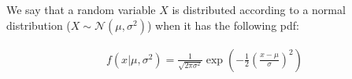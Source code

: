 \documentclass[10pt]{beamer}
\numberwithin{equation}{section}
\begin{document}
    \appendix

    \begin{frame}
        We say that a random variable $X$ is distributed
        according to a normal distribution ($X \sim \mathcal{N}(\mu, \sigma^2)$) when it has the following pdf:

        \begin{definition}
            \begin{align}
                \label{eq:pdf_normal_dist}
                f(x|\mu, \sigma^2) = \frac{1}{\sqrt{2\pi\sigma^2}}
                \exp{\left(-\frac{1}{2}\left(\frac{x-\mu}{\sigma}\right)^2\right)}
            \end{align}
        \end{definition}
    \end{frame}
\end{document}
